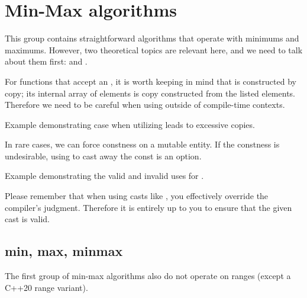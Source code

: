 \section{Min-Max algorithms}

This group contains straightforward algorithms that operate with minimums and maximums. However, two theoretical topics are relevant here, and we need to talk about them first:  and .

For functions that accept an , it is worth keeping in mind that  is constructed by copy; its internal array of elements is copy constructed from the listed elements. Therefore we need to be careful when using  outside of compile-time contexts.

\begin{box-note}
\footnotesize Example demonstrating case when utilizing  leads to excessive copies.
\tcblower
{}
\end{box-note}

In rare cases, we can force constness on a mutable entity. If the constness is undesirable, using  to cast away the const is an option.

\begin{box-note}
\footnotesize Example demonstrating the valid and invalid uses for .
\tcblower
{}
\end{box-note}

Please remember that when using casts like , you effectively override the compiler's judgment. Therefore it is entirely up to you to ensure that the given cast is valid.

\subsection{min, max, minmax}

The first group of min-max algorithms also do not operate on ranges (except a C++20 range variant).



